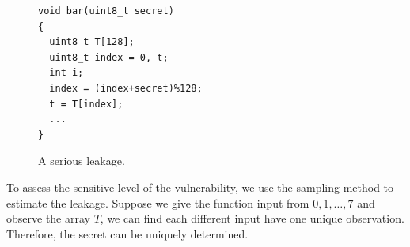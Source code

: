 \begin{figure}[h]
  \begin{minipage}{0.6\linewidth}
    \begin{lstlisting}[xleftmargin=.15\textwidth,xrightmargin=.30\textwidth]
void bar(uint8_t secret)
{
  uint8_t T[128];
  uint8_t index = 0, t;
  int i;
  index = (index+secret)%128;
  t = T[index];
  ...
}
\end{lstlisting}
  \end{minipage}
  \hfill
  \begin{minipage}{0.4\linewidth}
  \end{minipage}
  \caption{A serious leakage.}\label{chapter5:fig:example1}
\end{figure}

To assess the sensitive level of the vulnerability, we use the sampling method to estimate the leakage. Suppose we give the function input from $0, 1, \dots, 7$ and observe the array $T$, we can find each different input have one unique observation. Therefore, the secret can be uniquely determined.

